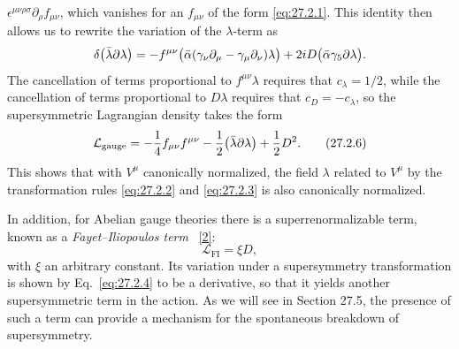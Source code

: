 \(\epsilon^{\mu\nu\rho\sigma}\partial_\rho f_{\mu\nu}\), which vanishes
for an \(f_{\mu\nu}\) of the form \eqref{eq:27.2.1}. This identity then
allows us to rewrite the variation of the \(\lambda\)-term as
\[
  \delta\bigl(\bar\lambda\sl{\partial}\lambda\bigr)
  =-f^{\mu\nu}
    \bigl(\bar\alpha(\gamma_\nu\partial_\mu
      -\gamma_\mu\partial_\nu)\lambda\bigr)
  +2iD\bigl(\bar\alpha\gamma_5\sl{\partial}\lambda\bigr).
\]
The cancellation of terms proportional to \(f^{\mu\nu}\lambda\) requires
that \(c_\lambda=1/2\), while the cancellation of terms proportional to
\(D\lambda\) requires that \(c_D=-c_\lambda\), so the supersymmetric
Lagrangian density takes the form
\begin{equation}
  \mathcal{L}_{\mathrm{gauge}}
  =-\frac14f_{\mu\nu}f^{\mu\nu}
  -\frac12\bigl(\bar\lambda\sl{\partial}\lambda\bigr)
  +\frac12D^2.
  \tag{27.2.6}\label{eq:27.2.6}
\end{equation}
This shows that with \(V^\mu\) canonically normalized, the field
\(\lambda\) related to \(V^\mu\) by the transformation rules
\eqref{eq:27.2.2} and \eqref{eq:27.2.3} is also canonically normalized.

In addition, for Abelian gauge theories there is a superrenormalizable
term, known as a \textit{Fayet--Iliopoulos term}%
~\hyperref[ch27-ref-2]{[2]}:
\begin{equation}
  \mathcal{L}_{\mathrm{FI}}=\xi D,
  \tag{27.2.7}\label{eq:27.2.7}
\end{equation}
with \(\xi\) an arbitrary constant. Its variation under a supersymmetry
transformation is shown by Eq.~\eqref{eq:27.2.4} to be a derivative, so
that it yields another supersymmetric term in the action. As we will see
in Section 27.5, the presence of such a term can provide a mechanism for
the spontaneous breakdown of supersymmetry.

